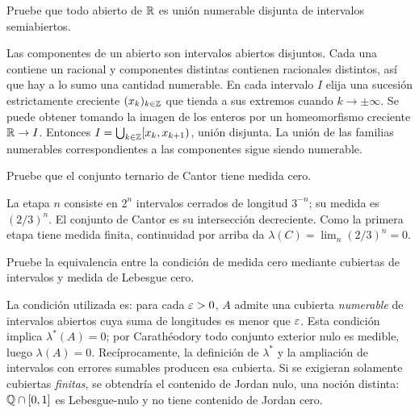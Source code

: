 \begin{ejercicio}\label{ej:v2-l06-1}
Pruebe que todo abierto de $\mathbb R$ es unión numerable disjunta de intervalos semiabiertos.
\end{ejercicio}
\begin{solucion}
Las componentes de un abierto son intervalos abiertos disjuntos. Cada una contiene un racional y componentes distintas contienen racionales distintos, así que hay a lo sumo una cantidad numerable. En cada intervalo $I$ elija una sucesión estrictamente creciente $(x_k)_{k\in\mathbb Z}$ que tienda a sus extremos cuando $k\to\pm\infty$. Se puede obtener tomando la imagen de los enteros por un homeomorfismo creciente $\mathbb R\to I$. Entonces $I=\bigcup_{k\in\mathbb Z}[x_k,x_{k+1})$, unión disjunta. La unión de las familias numerables correspondientes a las componentes sigue siendo numerable.
\end{solucion}

\begin{ejercicio}\label{ej:v2-l06-2}
Pruebe que el conjunto ternario de Cantor tiene medida cero.
\end{ejercicio}
\begin{solucion}
La etapa $n$ consiste en $2^n$ intervalos cerrados de longitud $3^{-n}$; su medida es $(2/3)^n$. El conjunto de Cantor es su intersección decreciente. Como la primera etapa tiene medida finita, continuidad por arriba da $\lambda(C)=\lim_n(2/3)^n=0$.
\end{solucion}

\begin{ejercicio}\label{ej:v2-l06-3}
Pruebe la equivalencia entre la condición de medida cero mediante cubiertas de intervalos y medida de Lebesgue cero.
\end{ejercicio}
\begin{solucion}
La condición utilizada es: para cada $\varepsilon>0$, $A$ admite una cubierta \emph{numerable} de intervalos abiertos cuya suma de longitudes es menor que $\varepsilon$. Esta condición implica $\lambda^*(A)=0$; por Carathéodory todo conjunto exterior nulo es medible, luego $\lambda(A)=0$. Recíprocamente, la definición de $\lambda^*$ y la ampliación de intervalos con errores sumables producen esa cubierta. Si se exigieran solamente cubiertas \emph{finitas}, se obtendría el contenido de Jordan nulo, una noción distinta: $\mathbb Q\cap[0,1]$ es Lebesgue-nulo y no tiene contenido de Jordan cero.
\end{solucion}

